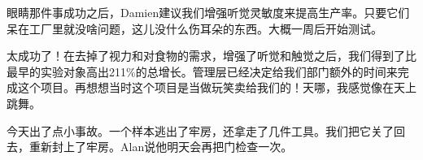 \begin{scpbox}

眼睛那件事成功之后，Damien建议我们增强听觉灵敏度来提高生产率。只要它们呆在工厂里就没啥问题，这儿没什么伤耳朵的东西。大概一周后开始测试。

\end{scpbox}

\begin{scpbox}

太成功了！在去掉了视力和对食物的需求，增强了听觉和触觉之后，我们得到了比最早的实验对象高出211\%的总增长。管理层已经决定给我们部门额外的时间来完成这个项目。再想想当时这个项目是当做玩笑卖给我们的！天哪，我感觉像在天上跳舞。

今天出了点小事故。一个样本逃出了牢房，还拿走了几件工具。我们把它关了回去，重新封上了牢房。Alan说他明天会再把门检查一次。

\end{scpbox}
